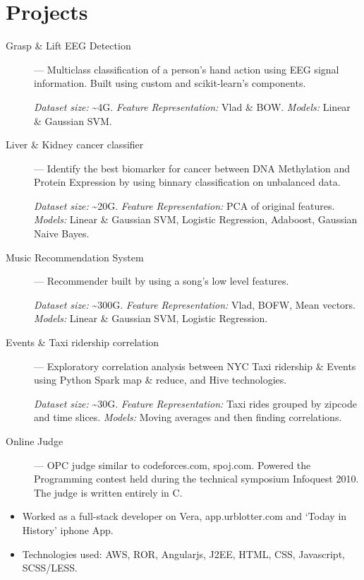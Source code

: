 \documentclass{resume}
\begin{document}
\section{Projects}
  \begin{description}
    \item[Grasp \& Lift EEG Detection] --- Multiclass classification of a person's hand action using EEG signal information.  Built using custom and scikit-learn's components.
      \par \textit{Dataset size:} \textasciitilde{}4G.  \textit{Feature Representation:} Vlad \& BOW\@.  \textit{Models:} Linear \& Gaussian SVM\@.
    \item[Liver \& Kidney cancer classifier] --- Identify the best biomarker for cancer between DNA Methylation and Protein Expression by using binnary classification on unbalanced data.
      \par \textit{Dataset size:} \textasciitilde{}20G.  \textit{Feature Representation:} PCA of original features.  \textit{Models:} Linear \& Gaussian SVM\@, Logistic Regression, Adaboost, Gaussian Naive Bayes.
    \item[Music Recommendation System] --- Recommender built by using a song's low level features.
      \par \textit{Dataset size:} \textasciitilde{}300G.  \textit{Feature Representation:} Vlad, BOFW, Mean vectors.  \textit{Models:} Linear \& Gaussian SVM, Logistic Regression.
    \item[Events \& Taxi ridership correlation] --- Exploratory correlation analysis between NYC Taxi ridership \& Events using Python Spark map \& reduce, and Hive technologies.
      \par \textit{Dataset size:} \textasciitilde{}30G. \textit{Feature Representation:} Taxi rides grouped by zipcode and time slices.  \textit{Models:} Moving averages and then finding correlations.
    \item[Online Judge] --- OPC judge similar to codeforces.com, spoj.com.  Powered the Programming contest held during the technical symposium Infoquest 2010.  The judge is written entirely in C.
  \end{description}


\begin{itemize} \itemsep1pt \parskip0pt
  \item Worked as a full-stack developer on Vera, app.urblotter.com and `Today in History' iphone App.
  \item Technologies used: AWS, ROR, Angularjs, J2EE, HTML, CSS, Javascript, SCSS/LESS\@.
\end{itemize}
\end{document}

